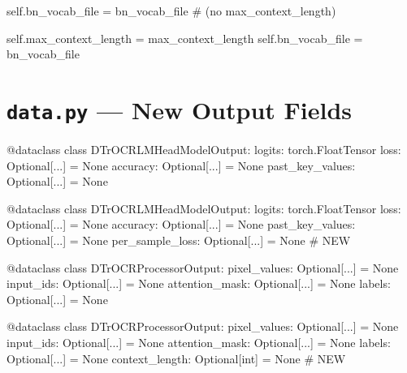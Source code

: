 \documentclass[11pt, a4paper]{report}
\begin{document}
\vspace{0.5em}
\begin{minipage}[t]{0.48\textwidth}
\begin{originalcode}
self.bn_vocab_file = bn_vocab_file
# (no max_context_length)
\end{originalcode}
\end{minipage}
\hfill
\begin{minipage}[t]{0.48\textwidth}
\begin{newcode}
self.max_context_length = max_context_length
self.bn_vocab_file = bn_vocab_file
\end{newcode}
\end{minipage}


\section{\texttt{data.py} --- New Output Fields}
\label{sec:code-data}

\begin{minipage}[t]{0.48\textwidth}
\begin{originalcode}
@dataclass
class DTrOCRLMHeadModelOutput:
    logits: torch.FloatTensor
    loss: Optional[...] = None
    accuracy: Optional[...] = None
    past_key_values: Optional[...] = None
\end{originalcode}
\end{minipage}
\hfill
\begin{minipage}[t]{0.48\textwidth}
\begin{newcode}
@dataclass
class DTrOCRLMHeadModelOutput:
    logits: torch.FloatTensor
    loss: Optional[...] = None
    accuracy: Optional[...] = None
    past_key_values: Optional[...] = None
    per_sample_loss: Optional[...] = None  # NEW
\end{newcode}
\end{minipage}

\vspace{0.5em}
\begin{minipage}[t]{0.48\textwidth}
\begin{originalcode}
@dataclass
class DTrOCRProcessorOutput:
    pixel_values: Optional[...] = None
    input_ids: Optional[...] = None
    attention_mask: Optional[...] = None
    labels: Optional[...] = None
\end{originalcode}
\end{minipage}
\hfill
\begin{minipage}[t]{0.48\textwidth}
\begin{newcode}
@dataclass
class DTrOCRProcessorOutput:
    pixel_values: Optional[...] = None
    input_ids: Optional[...] = None
    attention_mask: Optional[...] = None
    labels: Optional[...] = None
    context_length: Optional[int] = None  # NEW
\end{newcode}
\end{minipage}
\end{document}

